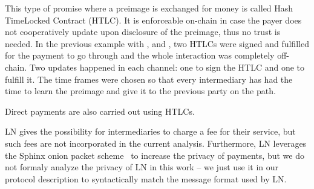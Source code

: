     This type of promise where a preimage is exchanged for money is called Hash
    TimeLocked Contract (HTLC). It is enforceable on-chain in case the payer
    does not cooperatively update upon disclosure of the preimage, thus no trust
    is needed. In the previous example with \alice{}, \bob{} and \charlie, two
    HTLCs were signed and fulfilled for the payment to go through and the whole
    interaction was completely off-chain. Two updates happened in each channel:
    one to sign the HTLC and one to fulfill it. The time frames were chosen so
    that every intermediary has had the time to learn the preimage and give it
    to the previous party on the path.

    Direct payments are also carried out using HTLCs.

    LN gives the possibility for intermediaries to charge a fee for their
    service, but such fees are not incorporated in the current analysis.
    Furthermore, LN leverages the Sphinx onion packet scheme~\cite{sphinx} to
    increase the privacy of payments, but we do not formaly analyze the privacy
    of LN in this work -- we just use it in our protocol description to
    syntactically match the message format used by LN.
